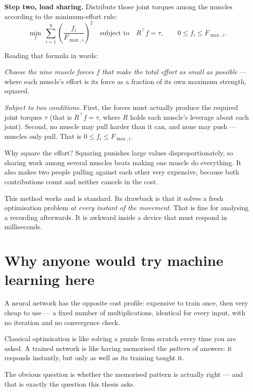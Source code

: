 \textbf{Step two, load sharing.} Distribute those joint torques among the muscles
according to the minimum-effort rule:
\[
\min_{f}\ \sum_{i=1}^{9}\left(\frac{f_i}{F_{\max,i}}\right)^{2}
\quad\text{subject to}\quad
R^{\top} f = \tau,\qquad 0 \le f_i \le F_{\max,i}.
\]

\begin{plain}
Reading that formula in words:

\emph{Choose the nine muscle forces $f$ that make the total effort as small as
possible} --- where each muscle's effort is its force as a fraction of its own
maximum strength, squared.

\emph{Subject to two conditions.} First, the forces must actually produce the
required joint torques $\tau$ (that is $R^{\top} f = \tau$, where $R$ holds each
muscle's leverage about each joint). Second, no muscle may pull harder than it
can, and none may push --- muscles only pull. That is $0 \le f_i \le F_{\max,i}$.

Why square the effort? Squaring punishes large values disproportionately, so
sharing work among several muscles beats making one muscle do everything. It also
makes two people pulling against each other very expensive, because both
contributions count and neither cancels in the cost.
\end{plain}

This method works and is standard. Its drawback is that it solves a fresh
optimisation problem \emph{at every instant of the movement}. That is fine for
analysing a recording afterwards. It is awkward inside a device that must respond
in milliseconds.

\section{Why anyone would try machine learning here}

A neural network has the opposite cost profile: expensive to train once, then
very cheap to use --- a fixed number of multiplications, identical for every
input, with no iteration and no convergence check.

\begin{plain}
Classical optimisation is like solving a puzzle from scratch every time you are
asked. A trained network is like having memorised the \emph{pattern} of answers:
it responds instantly, but only as well as its training taught it.

The obvious question is whether the memorised pattern is actually right --- and
that is exactly the question this thesis asks.
\end{plain}

